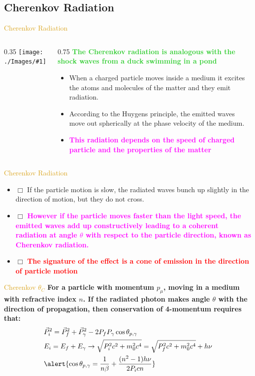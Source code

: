 \documentclass[11pt]{beamer} %
\renewcommand{\(}{\begin{columns}}
\renewcommand{\)}{\end{columns}}
\newcommand{\<}[1]{\begin{column}{#1}}
\renewcommand{\>}{\end{column}}
\newcommand{\itt}{\begin{itemize}}
\newcommand{\tti}{\end{itemize}}
\newcommand{\img}[1]{\texttt{[image: ./Images/\#1]}}
\newcommand{\hlt}[2]{\textcolor{#1}{\textbf{#2}}}
\begin{document}
\subsection{Cherenkov Radiation}
\begin{frame}{\textcolor{Goldenrod}{Cherenkov Radiation}}
  \(
  \<{0.35\textwidth}
  \img{cherenkov_rad}
  \>
  \<{0.75\textwidth}
  \hlt{LimeGreen}{The Cherenkov radiation is analogous with the shock
    waves from a duck swimming in a pond}
  \itt
\item When a charged particle moves
  inside a medium it excites the atoms and molecules of the
  matter and they emit radiation.
\item According to the Huygens principle, the emitted waves move out
  spherically at the phase velocity of the medium.
\item \hlt{Magenta}{This radiation depends on the speed of charged particle and the
    properties of the matter}
  \tti
  \>
  \)
\end{frame}

\begin{frame}{\textcolor{Goldenrod}{Cherenkov Radiation}}

\itt  
\item[$\Box$] If the particle motion is slow, the radiated waves bunch
  up slightly in the direction of motion, but they do not cross.
\item[$\Box$] \hlt{Magenta}{However if the particle moves faster than the light
    speed, the emitted waves add up constructively leading to a coherent
  radiation at angle $\theta$ with respect to the particle direction,
  known as Cherenkov radiation.}
\item[$\Box$] \hlt{Red}{The signature of the effect is a cone of
    emission in the direction of particle motion}
\tti
\end{frame}


\begin{frame}{\textcolor{Goldenrod}{Cherenkov $\theta_C$}}
  \hlt{NavyBlue}{For a particle with momentum $p_{\mu}$,  
    moving in a medium with refractive index $n$.
    If the radiated photon makes angle $\theta$ with the direction
    of propagation, then conservation of 4-momentum requires that:}
  \[
    \begin{aligned}
      &\vec{P}^2_i = \vec{P}^{2}_{f} + \vec{P}^2_{\gamma} -2P_f P_{\gamma}
      \cos{\theta_{p, \gamma}}\\
      & E_i = E_f + E_{\gamma} \to \sqrt{P^2_i c^2 + m^2_0 c^4} =
      \sqrt{P^2_f c^2 + m^2_0 c^4} + h\nu\\
      & \alert{\cos{\theta_{p, \gamma}} = \frac{1}{n \beta } + 
        \frac{(n^2 -1)h\nu}{2P_i c n}}
    \end{aligned}
  \]
\end{frame}
\end{document}
